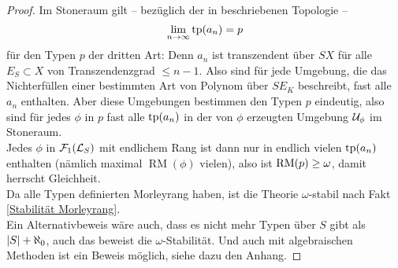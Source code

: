 \begin{proof}
        Im Stoneraum gilt \--- bezüglich der in \cite{Lukas} beschriebenen Topologie \--- $$\lim\limits_{n\rightarrow\infty}\operatorname{tp}(a_n)=p$$ für den Typen $p$ der dritten Art: Denn $a_n$ ist transzendent über $SX$ für alle $E_S\subset X$ von Transzendenzgrad $\leq n-1$. Also sind für jede Umgebung, die das Nichterfüllen einer bestimmten Art von Polynom über $SE_K$ beschreibt, fast alle $a_n$ enthalten. Aber diese Umgebungen bestimmen den Typen $p$ eindeutig, also sind für jedes $\phi$ in $p$ fast alle $\operatorname{tp}(a_n)$ in der von $\phi$ erzeugten Umgebung $\mathcal{U}_\phi$ im Stoneraum.\\
        Jedes $\phi$ in $\mathcal{F}_1(\mathcal{L}_S)$ mit endlichem Rang ist dann nur in endlich vielen $\operatorname{tp}(a_n)$ enthalten (nämlich maximal $\operatorname{RM}(\phi)$ vielen), also ist $\operatorname{RM}(p)\geq\omega$, damit herrscht Gleichheit.\\
        Da alle Typen definierten Morleyrang haben, ist die Theorie $\omega$-stabil  nach Fakt \ref{Stabilität Morleyrang}.\\
        Ein Alternativbeweis wäre auch, dass es nicht mehr Typen über $S$ gibt als ${\left| S \right|}+\aleph_0$, auch das beweist die $\omega$-Stabilität. Und auch mit algebraischen Methoden ist ein Beweis möglich, siehe dazu den Anhang.
    \end{proof}